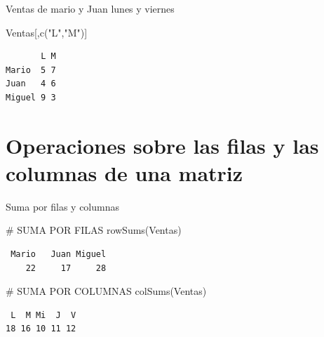 \documentclass[
  ignorenonframetext,
  aspectratio=169,
  spanish,
]{beamer}
\newenvironment{Shaded}{\begin{snugshade}}{\end{snugshade}}
\newcommand{\CommentTok}[1]{\textcolor[rgb]{0.37,0.37,0.37}{#1}}
\newcommand{\FunctionTok}[1]{\textcolor[rgb]{0.28,0.35,0.67}{#1}}
\newcommand{\NormalTok}[1]{\textcolor[rgb]{0.00,0.23,0.31}{#1}}
\newcommand{\StringTok}[1]{\textcolor[rgb]{0.13,0.47,0.30}{#1}}
\begin{document}
\begin{frame}[fragile]{Ventas de mario y Juan lunes y viernes}
\begin{Shaded}
\begin{Highlighting}[]
\NormalTok{Ventas[,}\FunctionTok{c}\NormalTok{(}\StringTok{"L"}\NormalTok{,}\StringTok{"M"}\NormalTok{)]}
\end{Highlighting}
\end{Shaded}

\begin{verbatim}
       L M
Mario  5 7
Juan   4 6
Miguel 9 3
\end{verbatim}
\end{frame}

\section{Operaciones sobre las filas y las columnas de una
matriz}\label{operaciones-sobre-las-filas-y-las-columnas-de-una-matriz}

\begin{frame}[fragile]{Suma por filas y columnas}
\label{suma-por-filas-y-columnas}
\begin{Shaded}
\begin{Highlighting}[]
\CommentTok{\# SUMA POR FILAS }
\FunctionTok{rowSums}\NormalTok{(Ventas)}
\end{Highlighting}
\end{Shaded}

\begin{verbatim}
 Mario   Juan Miguel 
    22     17     28 
\end{verbatim}

\begin{Shaded}
\begin{Highlighting}[]
\CommentTok{\# SUMA POR COLUMNAS }
\FunctionTok{colSums}\NormalTok{(Ventas)}
\end{Highlighting}
\end{Shaded}

\begin{verbatim}
 L  M Mi  J  V 
18 16 10 11 12 
\end{verbatim}
\end{frame}
\end{document}
